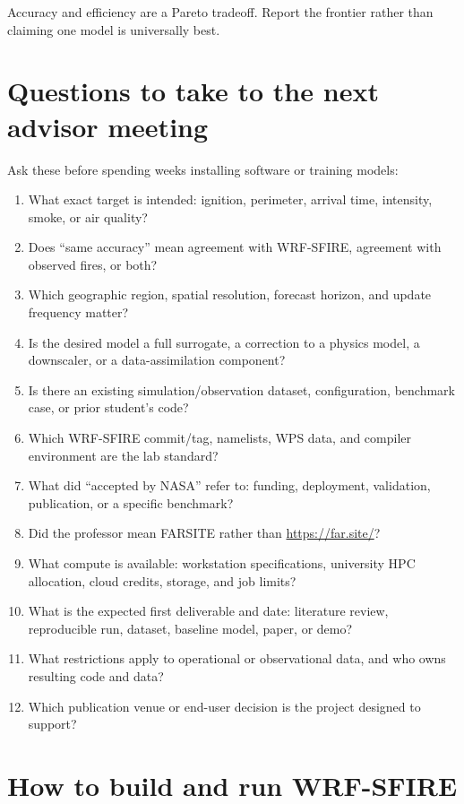 \documentclass[11pt]{article}
\begin{document}
Accuracy and efficiency are a Pareto tradeoff. Report the frontier rather than claiming one model is universally best.

\section{Questions to take to the next advisor meeting}

Ask these before spending weeks installing software or training models:

\begin{enumerate}
  \item What exact target is intended: ignition, perimeter, arrival time, intensity, smoke, or air quality?
  \item Does ``same accuracy'' mean agreement with WRF-SFIRE, agreement with observed fires, or both?
  \item Which geographic region, spatial resolution, forecast horizon, and update frequency matter?
  \item Is the desired model a full surrogate, a correction to a physics model, a downscaler, or a data-assimilation component?
  \item Is there an existing simulation/observation dataset, configuration, benchmark case, or prior student's code?
  \item Which WRF-SFIRE commit/tag, namelists, WPS data, and compiler environment are the lab standard?
  \item What did ``accepted by NASA'' refer to: funding, deployment, validation, publication, or a specific benchmark?
  \item Did the professor mean FARSITE rather than \url{https://far.site/}?
  \item What compute is available: workstation specifications, university HPC allocation, cloud credits, storage, and job limits?
  \item What is the expected first deliverable and date: literature review, reproducible run, dataset, baseline model, paper, or demo?
  \item What restrictions apply to operational or observational data, and who owns resulting code and data?
  \item Which publication venue or end-user decision is the project designed to support?
\end{enumerate}

\section{How to build and run WRF-SFIRE}
\end{document}
